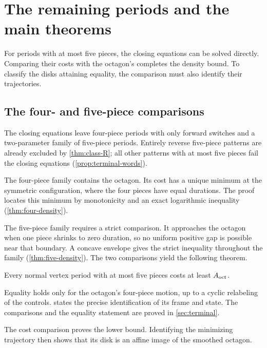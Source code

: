 \section{The remaining periods and the main theorems}\label{sec:outline-terminal}

For periods with at most five pieces, the closing equations can be solved directly. Comparing
their costs with the octagon's completes the density bound. To classify the disks attaining
equality, the comparison must also identify their trajectories.

\subsection{The four- and five-piece comparisons}\label{sec:outline-short}

The closing equations leave four-piece periods with only forward switches and a two-parameter
family of five-piece periods. Entirely reverse five-piece patterns are already excluded by
\cref{thm:class-R}; all other patterns with at most five pieces fail the closing equations
(\cref{prop:terminal-words}).

The four-piece family contains the octagon. Its cost has a unique minimum at the symmetric
configuration, where the four pieces have equal durations. The proof locates this minimum by
monotonicity and an exact logarithmic inequality (\cref{thm:four-density}).

The five-piece family requires a strict comparison. It approaches the octagon when one piece
shrinks to zero duration, so no uniform positive gap is possible near that boundary. A concave
envelope gives the strict inequality throughout the family (\cref{thm:five-density}). The two
comparisons yield the following theorem.

\begin{theorem}\label{thm:terminal}
Every normal vertex period with at most five pieces costs at least $A_{\mathrm{oct}}$.
\end{theorem}

Equality holds only for the octagon's four-piece motion, up to a cyclic relabeling of the
controls.  states the precise identification of its frame and state.
The comparisons and the equality statement are proved in \cref{sec:terminal}.

The cost comparison proves the lower bound. Identifying the minimizing trajectory then shows that
its disk is an affine image of the smoothed octagon.

